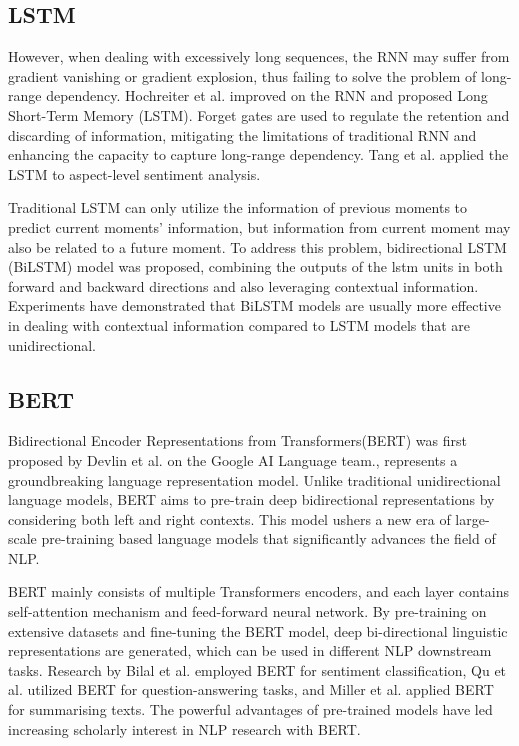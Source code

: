 \documentclass[ %
                    author={Louis Wang},
                supervisor={Dr. Qiang Liu},
                    degree={MSc},
                     title={Identification of Suicide Ideation in Texts},
                      type={},
                      year={2024}]{dissertation}
\begin{document}
\subsection{LSTM}
\noindent
However, when dealing with excessively long sequences, the RNN may suffer from gradient vanishing or gradient explosion, thus failing to solve the problem of long-range dependency. Hochreiter et al. improved on the RNN and proposed Long Short-Term Memory (LSTM).\cite{hochreiter1997long} Forget gates are used to regulate the retention and discarding of information\cite{greff2016lstm}, mitigating the limitations of traditional RNN and enhancing the capacity to capture long-range dependency. Tang et al. applied the LSTM to aspect-level sentiment analysis.\cite{tang2015target}

Traditional LSTM can only utilize the information of previous moments to predict current moments' information, but information from current moment may also be related to a future moment. To address this problem, bidirectional LSTM (BiLSTM) model was proposed, combining the outputs of the lstm units in both forward and backward directions and also leveraging contextual information. Experiments have demonstrated that BiLSTM models are usually more effective in dealing with contextual information compared to LSTM models that are unidirectional.\cite{hameed2019computationally}

\subsection{BERT}
\noindent
Bidirectional Encoder Representations from Transformers(BERT) was first proposed by Devlin et al. on the Google AI Language team.\cite{devlin2018bert}, represents a groundbreaking language representation model. Unlike traditional unidirectional language models, BERT aims to pre-train deep bidirectional representations by considering both left and right contexts. This model ushers a new era of large-scale pre-training based language models that significantly advances the field of NLP.

BERT mainly consists of multiple Transformers encoders, and each layer contains self-attention mechanism and feed-forward neural network.\cite{vaswani2017attention} By pre-training on extensive datasets and fine-tuning the BERT model, deep bi-directional linguistic representations are generated, which can be used in different NLP downstream tasks. Research by Bilal et al. employed BERT for sentiment classification\cite{bilal2023effectiveness}, Qu et al. utilized BERT for question-answering tasks\cite{qu2019bert}, and Miller et al. applied BERT for summarising texts\cite{miller2019leveraging}. The powerful advantages of pre-trained models have led increasing scholarly interest in NLP research with BERT.
\end{document}
